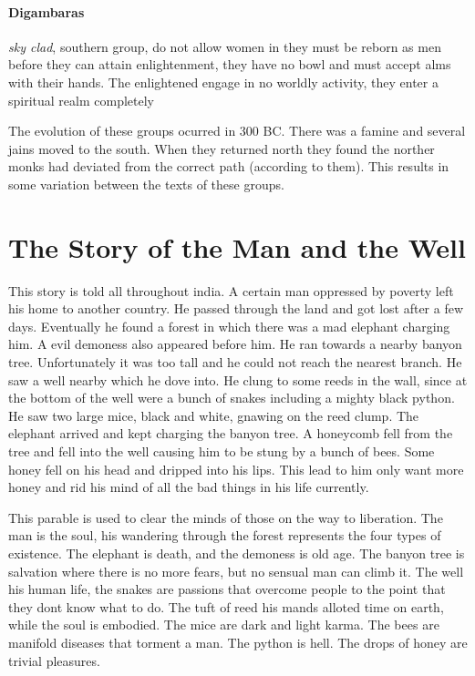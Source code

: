 \documentclass{article}
\begin{document}
\paragraph{Digambaras}
\label{par:digambaras}
\emph{sky clad}, southern group, do not allow women in they must be reborn as men before they can attain enlightenment, they have no bowl and must accept alms with their hands. The enlightened engage in no worldly activity, they enter a spiritual realm completely

The evolution of these groups ocurred in 300 BC. There was a famine and several jains moved to the south. When they returned north they found the norther monks had deviated from the correct path (according to them). This results in some variation between the texts of these groups.

\section*{The Story of the Man and the Well}
\label{sec:the_story_of_the_man_and_the_well}
This story is told all throughout india. A certain man oppressed by poverty left his home to another country. He passed through the land and got lost after a few days. Eventually he found a forest in which there was a mad elephant charging him. A evil demoness also appeared before him. He ran towards a nearby banyon tree. Unfortunately it was too tall and he could not reach the nearest branch. He saw a well nearby which he dove into. He clung to some reeds in the wall, since at the bottom of the well were a bunch of snakes including a mighty black python. He saw two large mice, black and white, gnawing on the reed clump. The elephant arrived and kept charging the banyon tree. A honeycomb fell from the tree and fell into the well causing him to be stung by a bunch of bees. Some honey fell on his head and dripped into his lips. This lead to him only want more honey and rid his mind of all the bad things in his life currently.

This parable is used to clear the minds of those on the way to liberation. The man is the soul, his wandering through the forest represents the four types of existence. The elephant is death, and the demoness is old age. The banyon tree is salvation where there is no more fears, but no sensual man can climb it. The well his human life, the snakes are passions that overcome people to the point that they dont know what to do. The tuft of reed his mands alloted time on earth, while the soul is embodied. The mice are dark and light karma. The bees are manifold diseases that torment a man. The python is hell. The drops of honey are trivial pleasures.
\end{document}
